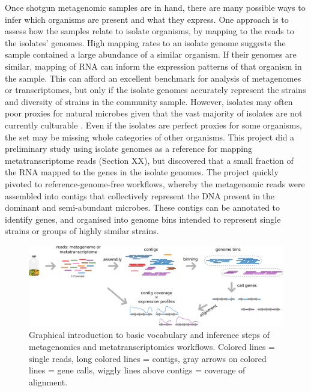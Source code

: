 Once shotgun metagenomic samples are in hand, there are many possible ways to infer which organisms are present and what they express.
One approach is to assess how the samples relate to isolate organisms, by mapping to the reads to the isolates' genomes.
High mapping rates to an isolate genome suggests the sample contained a large abundance of a similar organism.
If their genomes are similar, mapping of RNA can inform the expression patterns of that organism in the sample.
This can afford an excellent benchmark for analysis of metagenomes or transcriptomes, but only if the isolate genomes accurately represent the strains and diversity of strains in the community sample.
However, isolates may often poor proxies for natural microbes given that the vast majority of isolates are not currently culturable \cite{kaeberlein2002, stewart2012}.
Even if the isolates are perfect proxies for some organisms, the set may be missing whole categories of other organisms.
This project did a preliminary study using isolate genomes as a reference for mapping metatranscriptome reads (Section XX), but discovered that a small fraction of the RNA mapped to the genes in the isolate genomes.
The project quickly pivoted to reference-genome-free workflows, whereby the metagenomic reads were assembled into contigs that collectively represent the DNA present in the dominant and semi-abundant microbes.
These contigs can be annotated to identify genes, and organised into genome bins intended to represent single strains or groups of highly similar strains.

\begin{figure}[H]
\centering
    \includegraphics[width=1.0\textwidth]{./tex/chapter2/figures/170312_metagenomics_metatranscriptomics_overview.pdf}
    \begin{singlespace}
    \caption[Overview of metagenomics/metatranscriptomics workflow.]{
       Graphical introduction to basic vocabulary and inference steps of metagenomics and metatranscriptomics workflows.
	   Colored lines = single reads, long colored lines = contigs,
	   gray arrows on colored lines = gene calls, wiggly lines above contigs = coverage of alignment.}
    \label{fig:meta_workflow}
    \end{singlespace}
\end{figure}

